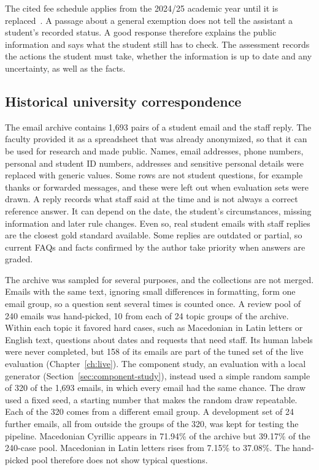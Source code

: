 The cited fee schedule applies from the 2024/25 academic year until it is replaced~\cite{finki2024fees}. A passage about a general exemption does not tell the assistant a student's recorded status. A good response therefore explains the public information and says what the student still has to check. The assessment records the actions the student must take, whether the information is up to date and any uncertainty, as well as the facts.

\subsection{Historical university correspondence}

The email archive contains 1,693 pairs of a student email and the staff reply. The faculty provided it as a spreadsheet that was already anonymized, so that it can be used for research and made public. Names, email addresses, phone numbers, personal and student ID numbers, addresses and sensitive personal details were replaced with generic values. Some rows are not student questions, for example thanks or forwarded messages, and these were left out when evaluation sets were drawn. A reply records what staff said at the time and is not always a correct reference answer. It can depend on the date, the student's circumstances, missing information and later rule changes. Even so, real student emails with staff replies are the closest gold standard available. Some replies are outdated or partial, so current FAQs and facts confirmed by the author take priority when answers are graded.

The archive was sampled for several purposes, and the collections are not merged. Emails with the same text, ignoring small differences in formatting, form one email group, so a question sent several times is counted once. A review pool of 240 emails was hand-picked, 10 from each of 24 topic groups of the archive. Within each topic it favored hard cases, such as Macedonian in Latin letters or English text, questions about dates and requests that need staff. Its human labels were never completed, but 158 of its emails are part of the tuned set of the live evaluation (Chapter~\ref{ch:live}). The component study, an evaluation with a local generator (Section~\ref{sec:component-study}), instead used a simple random sample of 320 of the 1,693 emails, in which every email had the same chance. The draw used a fixed seed, a starting number that makes the random draw repeatable. Each of the 320 comes from a different email group. A development set of 24 further emails, all from outside the groups of the 320, was kept for testing the pipeline. Macedonian Cyrillic appears in 71.94\% of the archive but 39.17\% of the 240-case pool. Macedonian in Latin letters rises from 7.15\% to 37.08\%. The hand-picked pool therefore does not show typical questions.

